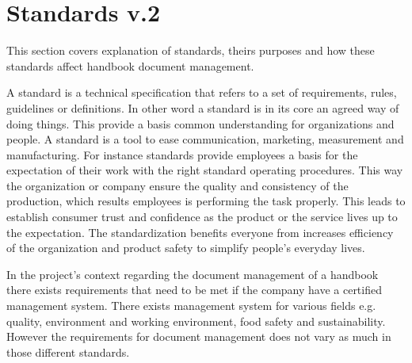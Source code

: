 \section{Standards v.2}


This section covers explanation of standards, theirs purposes and how these standards affect handbook document management. 

A standard is a technical specification that refers to a set of requirements, rules, guidelines or definitions. In other word a standard is in its core an agreed way of doing things. This provide a basis common understanding for organizations and people.  A standard is a tool to ease communication, marketing, measurement and manufacturing. For instance standards provide employees a basis for the expectation of their work with the right standard operating procedures. This way the organization or company ensure the quality and consistency of the production, which results employees is performing the task properly. 
This leads to establish consumer trust and confidence as the product or the service lives up to the expectation. The standardization benefits everyone from increases efficiency of the organization and product safety to simplify people's everyday lives.

In the project's context regarding the document management of a handbook there exists requirements that need to be met if the company have a certified management system. There exists management system for various fields e.g. quality, environment and working environment, food safety and sustainability.  However the requirements for document management does not vary as much in those different standards. 

